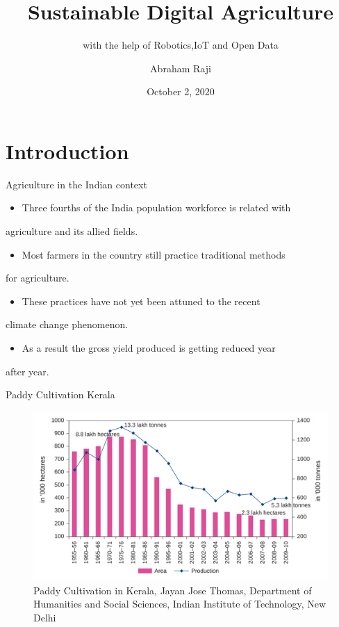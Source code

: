\documentclass[presentation]{beamer}
\author{Abraham Raji}
\date{October 2, 2020}
\title{Sustainable Digital Agriculture}
\subtitle{with the help of Robotics,IoT and Open Data}}
\institute[EI, SJCET]{Guide: Ms. Rashmi Annamma George}
\begin{document}
\maketitle

\section*{Introduction}
\label{sec:orgf94668c}
\begin{frame}[label={sec:org66d0e8c}]{Agriculture in the Indian context}
\begin{itemize}
\item Three fourths of the India population workforce is related with
\end{itemize}
agriculture and its allied fields.
\begin{itemize}
\item Most farmers in the country still practice traditional methods
\end{itemize}
for agriculture.
\begin{itemize}
\item These practices have not yet been attuned to the recent
\end{itemize}
climate change phenomenon.
\begin{itemize}
\item As a result the gross yield produced is getting reduced year
\end{itemize}
after year.
\end{frame}
\begin{frame}[label={sec:org87719b3}]{Paddy Cultivation Kerala}
\begin{figure}[htbp]
\centering
\includegraphics[width=.9\linewidth]{./images/graph.png}
\caption{Paddy Cultivation in Kerala, Jayan Jose Thomas, Department of Humanities and Social Sciences, Indian Institute of Technology, New Delhi}
\end{figure}
\end{frame}
\end{document}
